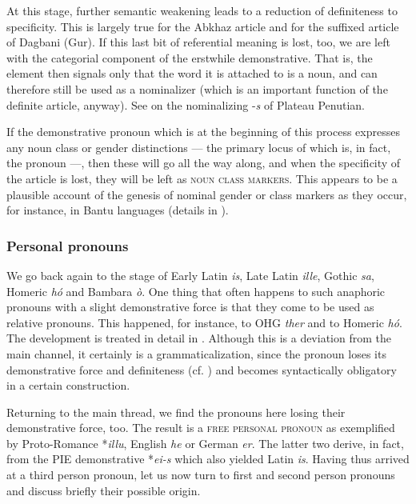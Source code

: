 At this stage, further semantic weakening leads to a reduction of definiteness to specificity. This is largely true for the Abkhaz article and for the suffixed article of Dagbani (Gur). If this last bit of referential meaning is lost, too, we are left with the categorial component of the erstwhile demonstrative. That is, the element then signals only that the word it is attached to is a noun, and can therefore still be used as a nominalizer (which is an important function of the definite article, anyway). See \citet[§3.5]{Greenberg1978} on the nominalizing -\textit{s} of Plateau Penutian.\label{PlateauPenutian}

If the demonstrative pronoun which is at the beginning of this process expresses any noun class or gender distinctions — the primary locus of which is, in fact, the pronoun —, then these will go all the way along, and when the specificity of the article is lost, they will be left as \textsc{noun class markers}. This appears to be a plausible account of the genesis of nominal gender or class markers as they occur, for instance, in Bantu languages (details in \citealt[§7.2]{Lehmann1982b}).

\subsubsection{Personal pronouns} \label{sec:3.2.1.2}
We go back again to the stage of Early Latin \textit{is}, Late Latin \textit{ille}, Gothic \textit{sa}, Homeric \textit{hó} and Bambara \textit{ò}. One thing that often happens to such anaphoric pronouns with a slight demonstrative force is that they come to be used as relative pronouns. This happened, for instance, to OHG \textit{ther} and to Homeric \textit{hó}. The development is treated in detail in \citet[Ch.~\textsc{vi}.1.1.2 and 1.2.2]{Lehmann1984}. Although this is a deviation from the main channel, it certainly is a grammaticalization, since the pronoun loses its demonstrative force and definiteness (cf. \citealt[Ch. \textsc{v}.2.3, §2]{Lehmann1984}) and becomes syntactically obligatory in a certain construction.

Returning to the main thread, we find the pronouns here losing their demonstrative force, too. The result is a \textsc{free personal pronoun} as exemplified by Proto-Romance *\textit{illu}, English \textit{he} or German \textit{er}. The latter two derive, in fact, from the PIE demonstrative *\textit{ei-s} which also yielded Latin \textit{is}. Having thus arrived at a third person pronoun, let us now turn to first and second person pronouns and discuss briefly their possible origin.

